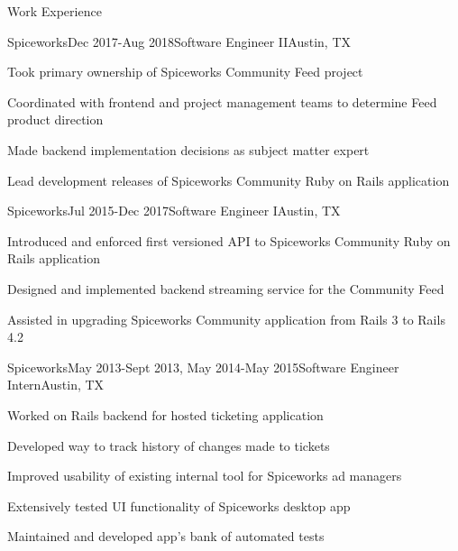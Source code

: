\documentclass{resume} %
\begin{document}

\begin{rSection}{Work Experience}

\begin{rSubsection}{Spiceworks}{Dec 2017-Aug 2018}{Software Engineer II}{Austin, TX}
\item Took primary ownership of Spiceworks Community Feed project
\item Coordinated with frontend and project management teams to determine Feed product direction
\item Made backend implementation decisions as subject matter expert
\item Lead development releases of Spiceworks Community Ruby on Rails application
\end{rSubsection}


\begin{rSubsection}{Spiceworks}{Jul 2015-Dec 2017}{Software Engineer I}{Austin, TX}
\item Introduced and enforced first versioned API to Spiceworks Community Ruby on Rails application
\item Designed and implemented backend streaming service for the Community Feed
\item Assisted in upgrading Spiceworks Community application from Rails 3 to Rails 4.2
\end{rSubsection}


\begin{rSubsection}{Spiceworks}{May 2013-Sept 2013, May 2014-May 2015}{Software Engineer Intern}{Austin, TX}
\item Worked on Rails backend for hosted ticketing application
\item Developed way to track history of changes made to tickets
\item Improved usability of existing internal tool for Spiceworks ad managers
\item Extensively tested UI functionality of Spiceworks desktop app
\item Maintained and developed app's bank of automated tests

\end{rSubsection}

\end{rSection}
\end{document}
